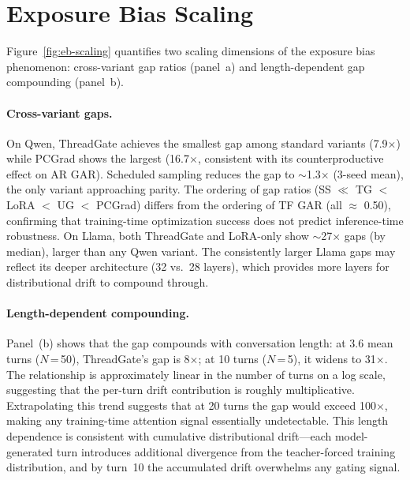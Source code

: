 \section{Exposure Bias Scaling}\label{sec:appendix-eb-scaling}

Figure~\ref{fig:eb-scaling} quantifies two scaling dimensions of the exposure bias phenomenon: cross-variant gap ratios (panel~a) and length-dependent gap compounding (panel~b).

\paragraph{Cross-variant gaps.} On Qwen, ThreadGate achieves the smallest gap among standard variants (7.9$\times$) while PCGrad shows the largest (16.7$\times$, consistent with its counterproductive effect on AR GAR). Scheduled sampling reduces the gap to ${\sim}$1.3$\times$ (3-seed mean), the only variant approaching parity. The ordering of gap ratios (SS $\ll$ TG $<$ LoRA $<$ UG $<$ PCGrad) differs from the ordering of TF GAR (all $\approx$ 0.50), confirming that training-time optimization success does not predict inference-time robustness. On Llama, both ThreadGate and LoRA-only show $\sim$27$\times$ gaps (by median), larger than any Qwen variant. The consistently larger Llama gaps may reflect its deeper architecture (32 vs.\ 28 layers), which provides more layers for distributional drift to compound through.

\paragraph{Length-dependent compounding.} Panel~(b) shows that the gap compounds with conversation length: at 3.6 mean turns ($N$\,=\,50), ThreadGate's gap is 8$\times$; at 10 turns ($N$\,=\,5), it widens to 31$\times$. The relationship is approximately linear in the number of turns on a log scale, suggesting that the per-turn drift contribution is roughly multiplicative. Extrapolating this trend suggests that at 20 turns the gap would exceed 100$\times$, making any training-time attention signal essentially undetectable. This length dependence is consistent with cumulative distributional drift---each model-generated turn introduces additional divergence from the teacher-forced training distribution, and by turn~10 the accumulated drift overwhelms any gating signal.

